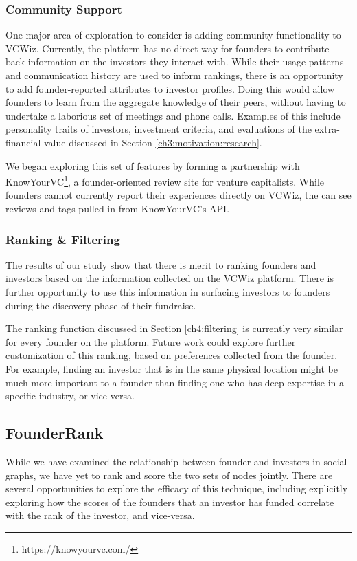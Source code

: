 \subsubsection{Community Support}

One major area of exploration to consider is adding community functionality to VCWiz. Currently, the platform has no direct way for founders to contribute back information on the investors they interact with. While their usage patterns and communication history are used to inform rankings, there is an opportunity to add founder-reported attributes to investor profiles. Doing this would allow founders to learn from the aggregate knowledge of their peers, without having to undertake a laborious set of meetings and phone calls. Examples of this include personality traits of investors, investment criteria, and evaluations of the extra-financial value discussed in Section \ref{ch3:motivation:research}.

We began exploring this set of features by forming a partnership with KnowYourVC\footnote{https://knowyourvc.com/}, a founder-oriented review site for venture capitalists. While founders cannot currently report their experiences directly on VCWiz, the can see reviews and tags pulled in from KnowYourVC's API.

\subsubsection{Ranking \& Filtering}

The results of our study show that there is merit to ranking founders and investors based on the information collected on the VCWiz platform. There is further opportunity to use this information in surfacing investors to founders during the discovery phase of their fundraise.

The ranking function discussed in Section \ref{ch4:filtering} is currently very similar for every founder on the platform. Future work could explore further customization of this ranking, based on preferences collected from the founder. For example, finding an investor that is in the same physical location might be much more important to a founder than finding one who has deep expertise in a specific industry, or vice-versa.

\subsection{FounderRank}

While we have examined the relationship between founder and investors in social graphs, we have yet to rank and score the two sets of nodes jointly. There are several opportunities to explore the efficacy of this technique, including explicitly exploring how the scores of the founders that an investor has funded correlate with the rank of the investor, and vice-versa.


